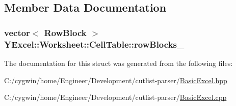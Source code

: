 \subsection{Member Data Documentation}
\hypertarget{struct_y_excel_1_1_worksheet_1_1_cell_table_ae8119004dcf7f7ce979dd7a9c0fbbc42}{}
\subsubsection[{row\+Blocks\+\_\+}]{\setlength{\rightskip}{0pt plus 5cm}vector$<$ {\bf Row\+Block} $>$ Y\+Excel\+::\+Worksheet\+::\+Cell\+Table\+::row\+Blocks\+\_\+}\label{struct_y_excel_1_1_worksheet_1_1_cell_table_ae8119004dcf7f7ce979dd7a9c0fbbc42}


The documentation for this struct was generated from the following files\+:\begin{DoxyCompactItemize}
\item 
C\+:/cygwin/home/\+Engineer/\+Development/cutlist-\/parser/\hyperlink{_basic_excel_8hpp}{Basic\+Excel.\+hpp}\item 
C\+:/cygwin/home/\+Engineer/\+Development/cutlist-\/parser/\hyperlink{_basic_excel_8cpp}{Basic\+Excel.\+cpp}\end{DoxyCompactItemize}
